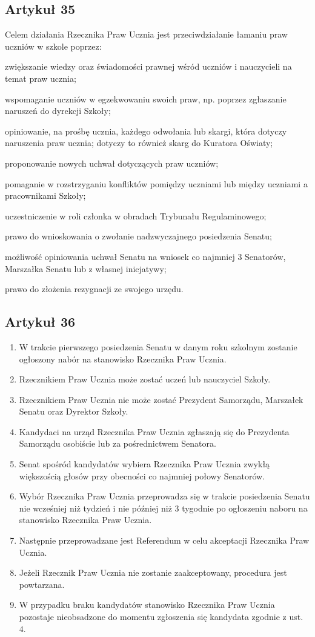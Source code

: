 \documentclass[14pt]{article}
\newcounter{podpunktyCounter}
\newenvironment{podpunkty}
{%
	\begin{list}{\arabic{podpunktyCounter})}%
		{%
			\usecounter{podpunktyCounter}
			\setlength{\itemsep}{1pt}
			\setlength{\topsep}{3pt}
		}%
	}%
	{\end{list}}
\newenvironment{ustepy}{%
	\begin{enumerate}[leftmargin=1.5em, itemindent=1pt, labelwidth=1em, itemsep=5pt]
	}{%
	\end{enumerate}
}
\begin{document}
\subsection*{Artykuł 35}
Celem działania Rzecznika Praw Ucznia jest przeciwdziałanie łamaniu praw uczniów w szkole poprzez:
\begin{podpunkty}
	\item zwiększanie wiedzy oraz świadomości prawnej wśród uczniów i nauczycieli na temat praw ucznia;
	\item wspomaganie uczniów w egzekwowaniu swoich praw, np. poprzez zgłaszanie naruszeń do dyrekcji Szkoły;
	\item opiniowanie, na prośbę ucznia, każdego odwołania lub skargi, która dotyczy naruszenia praw ucznia; dotyczy to również skarg do Kuratora Oświaty;
	\item proponowanie nowych uchwał dotyczących praw uczniów;
	\item pomaganie w rozstrzyganiu konfliktów pomiędzy uczniami lub między uczniami a pracownikami Szkoły;
	\item uczestniczenie w roli członka w obradach Trybunału Regulaminowego;
	\item prawo do wnioskowania o zwołanie nadzwyczajnego posiedzenia Senatu;
	\item możliwość opiniowania uchwał Senatu na wniosek co najmniej 3 Senatorów, Marszałka Senatu lub z własnej inicjatywy;
	\item prawo do złożenia rezygnacji ze swojego urzędu.
\end{podpunkty}
\subsection*{Artykuł 36}
\begin{ustepy}
	\item W trakcie pierwszego posiedzenia Senatu w danym roku szkolnym zostanie ogłoszony nabór na stanowisko Rzecznika Praw Ucznia.
	\item Rzecznikiem Praw Ucznia może zostać uczeń lub nauczyciel Szkoły.
	\item Rzecznikiem Praw Ucznia nie może zostać Prezydent Samorządu, Marszałek Senatu oraz Dyrektor Szkoły.
	\item Kandydaci na urząd Rzecznika Praw Ucznia zgłaszają się do Prezydenta Samorządu osobiście lub za pośrednictwem Senatora.
	\item Senat spośród kandydatów wybiera Rzecznika Praw Ucznia zwykłą większością głosów przy obecności co najmniej połowy Senatorów.
	\item Wybór Rzecznika Praw Ucznia przeprowadza się w trakcie posiedzenia Senatu nie wcześniej niż tydzień i nie później niż 3 tygodnie po ogłoszeniu naboru na stanowisko Rzecznika Praw Ucznia.
	\item Następnie przeprowadzane jest Referendum w celu akceptacji Rzecznika Praw Ucznia.
	\item Jeżeli Rzecznik Praw Ucznia nie zostanie zaakceptowany, procedura jest powtarzana.
	\item W przypadku braku kandydatów stanowisko Rzecznika Praw Ucznia pozostaje nieobsadzone do momentu zgłoszenia się kandydata zgodnie z ust. 4. 
	\end{ustepy}
\end{document}

